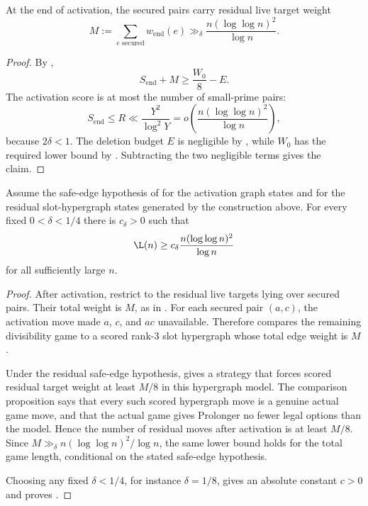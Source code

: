 \begin{proposition}\label{prop:t2-residual-mass}
At the end of activation, the secured pairs carry residual live target weight
\[
  M:=
  \sum_{e\text{ secured}} w_{\mathrm{end}}(e)
  \gg_\delta
  \frac{n(\log\log n)^2}{\log n}.
\]
\end{proposition}

\begin{proof}
By ,
\[
  S_{\mathrm{end}}+M\ge \frac{W_0}{8}-E.
\]
The activation score is at most the number of small-prime pairs:
\[
  S_{\mathrm{end}}\le R\ll \frac{Y^2}{\log^2Y}
  =
  o\!\left(\frac{n(\log\log n)^2}{\log n}\right),
\]
because $2\delta<1$.  The deletion budget $E$ is negligible by
, while $W_0$ has the required lower bound by
.  Subtracting the two negligible terms gives the
claim.
\end{proof}

\begin{proposition}\label{prop:t2-final}
Assume the safe-edge hypothesis of  for the
activation graph states and for the residual slot-hypergraph states generated
by the construction above.
For every fixed $0<\delta<1/4$ there is $c_\delta>0$ such that
\[
  \L(n)\ge c_\delta\frac{n(\log\log n)^2}{\log n}
\]
for all sufficiently large $n$.
\end{proposition}

\begin{proof}
After activation, restrict to the residual live targets lying over secured
pairs.  Their total weight is $M$, as in
.  For each secured pair $(a,c)$, the activation
move made $a$, $c$, and $ac$ unavailable.  Therefore
 compares the remaining divisibility game to a
scored rank-$3$ slot hypergraph whose total edge weight is $M$.

Under the residual safe-edge hypothesis,  gives a
strategy that forces scored residual target weight at least $M/8$ in this
hypergraph model.  The comparison proposition says that every such scored
hypergraph move is a genuine actual game move, and that the actual game gives
Prolonger no fewer legal options than the model.  Hence the number of residual
moves after activation is at least $M/8$.  Since
$M\gg_\delta n(\log\log n)^2/\log n$, the same lower bound holds for the total
game length, conditional on the stated safe-edge hypothesis.

Choosing any fixed $\delta<1/4$, for instance $\delta=1/8$, gives an absolute
constant $c>0$ and proves .
\end{proof}
